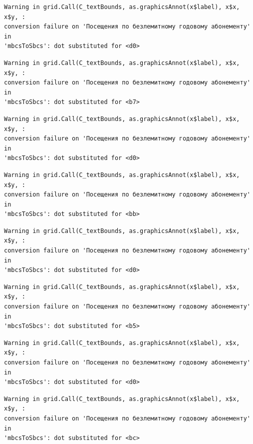 \documentclass[
  letterpaper,
  DIV=11,
  numbers=noendperiod]{scrartcl}
\begin{document}
\begin{verbatim}
Warning in grid.Call(C_textBounds, as.graphicsAnnot(x$label), x$x, x$y, :
conversion failure on 'Посещения по безлемитному годовому абонементу' in
'mbcsToSbcs': dot substituted for <d0>
\end{verbatim}

\begin{verbatim}
Warning in grid.Call(C_textBounds, as.graphicsAnnot(x$label), x$x, x$y, :
conversion failure on 'Посещения по безлемитному годовому абонементу' in
'mbcsToSbcs': dot substituted for <b7>
\end{verbatim}

\begin{verbatim}
Warning in grid.Call(C_textBounds, as.graphicsAnnot(x$label), x$x, x$y, :
conversion failure on 'Посещения по безлемитному годовому абонементу' in
'mbcsToSbcs': dot substituted for <d0>
\end{verbatim}

\begin{verbatim}
Warning in grid.Call(C_textBounds, as.graphicsAnnot(x$label), x$x, x$y, :
conversion failure on 'Посещения по безлемитному годовому абонементу' in
'mbcsToSbcs': dot substituted for <bb>
\end{verbatim}

\begin{verbatim}
Warning in grid.Call(C_textBounds, as.graphicsAnnot(x$label), x$x, x$y, :
conversion failure on 'Посещения по безлемитному годовому абонементу' in
'mbcsToSbcs': dot substituted for <d0>
\end{verbatim}

\begin{verbatim}
Warning in grid.Call(C_textBounds, as.graphicsAnnot(x$label), x$x, x$y, :
conversion failure on 'Посещения по безлемитному годовому абонементу' in
'mbcsToSbcs': dot substituted for <b5>
\end{verbatim}

\begin{verbatim}
Warning in grid.Call(C_textBounds, as.graphicsAnnot(x$label), x$x, x$y, :
conversion failure on 'Посещения по безлемитному годовому абонементу' in
'mbcsToSbcs': dot substituted for <d0>
\end{verbatim}

\begin{verbatim}
Warning in grid.Call(C_textBounds, as.graphicsAnnot(x$label), x$x, x$y, :
conversion failure on 'Посещения по безлемитному годовому абонементу' in
'mbcsToSbcs': dot substituted for <bc>
\end{verbatim}
\end{document}
